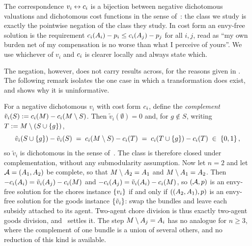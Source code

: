 The correspondence $v_i \leftrightarrow c_i$ is a bijection between negative
dichotomous valuations and dichotomous cost functions in the sense
of~\cite{BKNS22}: the class we study is exactly the pointwise negation of the
class they study. In cost form an envy-free solution is the requirement
$c_i(A_{i}) - p_i \le c_i(A_{j}) - p_j$ for all
$i,j$, read as ``my own burden net of my compensation is no worse than what I
perceive of yours''. We use whichever of $v_i$ and $c_i$ is clearer locally
and always state which.

\ifworking
The negation, however, does not carry results across, for the reasons given in
. The following remark isolates the one case in which a
transformation does exist, and shows why it is uninformative.

\begin{remark}[Complementation, and why it stops at $n = 2$]
\label{rem:complement}
For a negative dichotomous $v_i$ with cost form $c_i$, define the
\emph{complement} $\tilde{v}_i(S) := c_i(M) - c_i(M \setminus
S)$. Then $\tilde{v}_i(\emptyset) = 0$ and, for $g \notin S$, writing
$T := M \setminus (S \cup \left\{g\right\})$,
\[
  \tilde{v}_i(S \cup \left\{g\right\}) - \tilde{v}_i(S)
  \;=\; c_i(M \setminus S) - c_i(T)
  \;=\; c_i(T \cup \left\{g\right\}) - c_i(T) \;\in\; \left\{0,1\right\},
\]
so $\tilde{v}_i$ is dichotomous in the sense of~\cite{BKNS22}. The class is
therefore closed under complementation, without any submodularity assumption.
Now let $n = 2$ and let $\mathcal{A} = (A_{1},A_{2})$ be complete, so that
$M \setminus A_{2} = A_{1}$ and $M \setminus A_{1} =
A_{2}$. Then $-c_i(A_{i}) = \tilde{v}_i(A_{j}) -
c_i(M)$ and $-c_i(A_{j}) = \tilde{v}_i(A_{i}) -
c_i(M)$, so $(\mathcal{A}, p)$ is an envy-free solution for the chores
instance $\left\{v_i\right\}$ if and only if $((A_{2},A_{1}), p)$ is an
envy-free solution for the goods instance $\left\{\tilde{v}_i\right\}$: swap the bundles
and leave each subsidy attached to its agent. Two-agent chore division is thus
exactly two-agent goods division, and~\cite{BKNS22} settles it. The step
$M \setminus A_{j} = A_{i}$ has no analogue for $n \ge 3$, where
the complement of one bundle is a union of several others, and no reduction of
this kind is available.
\end{remark}
\fi

